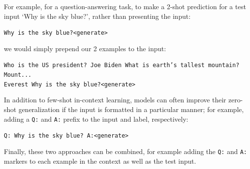 \documentclass[12pt]{article}
\begin{document}
For example, for a question-answering task, to make a 2-shot prediction for a test input `Why is the sky blue?', rather than presenting the input:

\texttt{Why is the sky blue?\textless generate\textgreater}

we would simply prepend our 2 examples to the input:

\texttt{Who is the US president? Joe Biden What is earth's tallest mountain? Mount... \\
Everest Why is the sky blue?\textless generate\textgreater}

In addition to few-shot in-context learning, models can often improve their zero-shot generalization if the input is formatted in a particular manner; for example, adding a \texttt{Q:} and \texttt{A:} prefix to the input and label, respectively:

\texttt{Q: Why is the sky blue? A:\textless generate\textgreater}

Finally, these two approaches can be combined, for example adding the \texttt{Q:} and \texttt{A:} markers to each example in the context as well as the test input.
\end{document}
